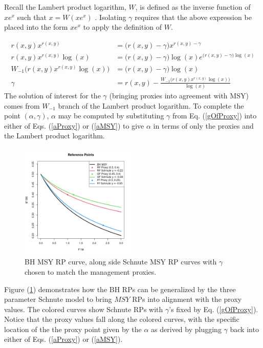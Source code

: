 %
Recall the Lambert product logarithm, $W$, is defined as the inverse function of $x e^x$ such that $x=W(xe^x)$ \cite{lehtonen_lambert_2016, corless_lambertw_1996}.
Isolating $\gamma$ requires that the above expression be placed into the form $xe^x$ to apply the definition of $W$. %

\begin{align}
r(x, y)x^{r(x, y)}&=\Big(r(x, y)-\gamma\Big)x^{r(x, y)-\gamma} \nonumber\\
r(x, y)x^{r(x, y)}\log(x) &= \Big(r(x, y)-\gamma\Big)\log(x) e^{\big(r(x, y)-\gamma\big)\log(x)} \nonumber\\
W_{-1}\Big(r(x, y)x^{r(x, y)}\log(x)\Big) &= \Big(r(x, y)-\gamma\Big)\log(x) \nonumber\\
\gamma &= r(x, y)-\frac{W_{-1}\Big(r(x, y)x^{r(x, y)}\log(x)\Big)}{\log(x)} \label{gOfProxy}
\end{align}
%
The solution of interest for the $\gamma$ (bringing proxies into agreement 
with MSY) comes from $W_{-1}$ branch of the Lambert product logarithm.
%
To complete the point $(\alpha, \gamma)$, $\alpha$ may be computed by 
substituting $\gamma$ from Eq. (\ref{gOfProxy}) into either of 
Eqs. (\ref{aProxy}) or (\ref{aMSY}) to give $\alpha$ in terms of only the proxies and the Lambert product logarithm. 

\begin{figure}
\includegraphics[width=0.49\textwidth]{../gpBias/rpProxAll0.2.png}
\vspace{-1.5cm}
\caption{\label{rpProxCurves}BH MSY RP curve, along side Schnute MSY RP curves with $\gamma$ chosen to match the management proxies. }
\end{figure}
%
Figure (\ref{rpProxCurves}) demonstrates how the BH RPs can be generalized by 
the three parameter Schnute model to bring $MSY$ RPs into alignment with the 
proxy values. The colored curves show Schnute RPs with $\gamma$'s fixed by 
Eq. (\ref{gOfProxy}). Notice that the proxy values fall along the colored 
curves, with the specific location of the the proxy point given by the $\alpha$ 
as derived by plugging $\gamma$ back into either of Eqs. (\ref{aProxy}) 
or (\ref{aMSY}).

